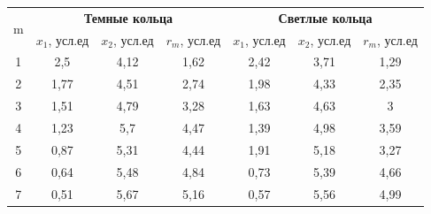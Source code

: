 \documentclass[a4paper,12pt]{report}
\begin{document}
\begin{table}[H]
\centering
\begin{tabular}{|c|ccc|ccc|}
\hline
\multirow{2}{*}{m} & \multicolumn{3}{c|}{\textbf{Темные кольца}}                                                         & \multicolumn{3}{c|}{\textbf{Светлые кольца}}                                                        \\ \cline{2-7} 
                   & \multicolumn{1}{l|}{$x_{1}$, усл.ед} & \multicolumn{1}{l|}{$x_{2}$, усл.ед} & \multicolumn{1}{l|}{$r_{m}$, усл.ед} & \multicolumn{1}{l|}{$x_{1}$, усл.ед} & \multicolumn{1}{l|}{$x_{2}$, усл.ед} & \multicolumn{1}{l|}{$r_{m}$, усл.ед} \\ \hline
1                  & \multicolumn{1}{c|}{2,5}        & \multicolumn{1}{c|}{4,12}       & 1,62                            & \multicolumn{1}{c|}{2,42}       & \multicolumn{1}{c|}{3,71}       & 1,29                            \\ \hline
2                  & \multicolumn{1}{c|}{1,77}       & \multicolumn{1}{c|}{4,51}       & 2,74                            & \multicolumn{1}{c|}{1,98}       & \multicolumn{1}{c|}{4,33}       & 2,35                            \\ \hline
3                  & \multicolumn{1}{c|}{1,51}       & \multicolumn{1}{c|}{4,79}       & 3,28                            & \multicolumn{1}{c|}{1,63}       & \multicolumn{1}{c|}{4,63}       & 3                               \\ \hline
4                  & \multicolumn{1}{c|}{1,23}       & \multicolumn{1}{c|}{5,7}        & 4,47                            & \multicolumn{1}{c|}{1,39}       & \multicolumn{1}{c|}{4,98}       & 3,59                            \\ \hline
5                  & \multicolumn{1}{c|}{0,87}       & \multicolumn{1}{c|}{5,31}       & 4,44                            & \multicolumn{1}{c|}{1,91}       & \multicolumn{1}{c|}{5,18}       & 3,27                            \\ \hline
6                  & \multicolumn{1}{c|}{0,64}       & \multicolumn{1}{c|}{5,48}       & 4,84                            & \multicolumn{1}{c|}{0,73}       & \multicolumn{1}{c|}{5,39}       & 4,66                            \\ \hline
7                  & \multicolumn{1}{c|}{0,51}       & \multicolumn{1}{c|}{5,67}       & 5,16                            & \multicolumn{1}{c|}{0,57}       & \multicolumn{1}{c|}{5,56}       & 4,99                            \\ \hline

\end{tabular}
\end{table}
\end{document}
